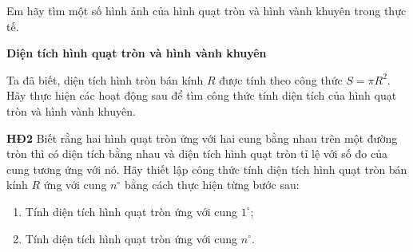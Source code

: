 \begin{lesson}
    \begin{center}
    \end{center}

    Em hãy tìm một số hình ảnh của hình quạt tròn và hình vành khuyên trong thực tế.

    \answerline
    \answerline

    \textbf{Diện tích hình quạt tròn và hình vành khuyên}

    Ta đã biết, diện tích hình tròn bán kính $R$ được tính theo công thức $S=\pi R^2$. Hãy thực hiện các hoạt động sau để tìm công thức tính diện tích của hình quạt tròn và hình vành khuyên.

    \textbf{HĐ2} Biết rằng hai hình quạt tròn ứng với hai cung bằng nhau trên một đường tròn thì có diện tích bằng nhau và diện tích hình quạt tròn tỉ lệ với số đo của cung tương ứng với nó. Hãy thiết lập công thức tính diện tích hình quạt tròn bán kính $R$ ứng với cung $n^\circ$ bằng cách thực hiện từng bước sau:
    \begin{enumerate}[label=\alph*)]
        \item Tính diện tích hình quạt tròn ứng với cung $1^\circ$;

        \answerline
        \item Tính diện tích hình quạt tròn ứng với cung $n^\circ$.


\end{enumerate}
\end{lesson}
